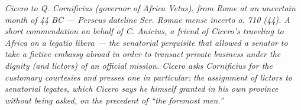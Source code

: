 
\textit{Cicero to Q. Cornificius (governor of Africa Vetus), from Rome at an uncertain month of 44 BC ---
Perseus dateline \textit{Scr. Romae mense incerto a. 710 (44)}. A short commendation on behalf of C. Anicius, a friend of Cicero's traveling to Africa on a \textit{legatio libera} --- the senatorial perquisite that allowed a senator to take a fictive embassy abroad in order to transact private business under the dignity (and lictors) of an official mission. Cicero asks Cornificius for the customary courtesies and presses one in particular: the assignment of lictors to senatorial legates, which Cicero says he himself granted in his own province without being asked, on the precedent of ``the foremost men.''}
